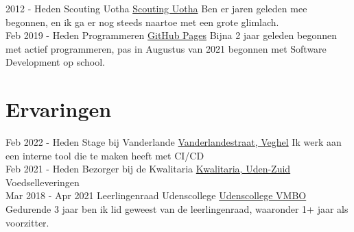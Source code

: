 \documentclass[letterpaper]{twentysecondcv} %
\begin{document}
    \begin{twenty} %
        \twentyitem
        {2012 -}
        {Heden}
        {Scouting Uotha}
        {\href{https://www.uotha.nl/}{Scouting Uotha}}
        {}
        { Ben er jaren geleden mee begonnen, en ik ga er nog steeds naartoe met een grote glimlach.}\\
        \twentyitem
        {Feb 2019 -}
        {Heden}
        {Programmeren}
        {\href{https://tais993.github.io/}{GitHub Pages}}
        {}
        {
            Bijna 2 jaar geleden begonnen met actief programmeren, pas in Augustus van 2021 begonnen met Software Development op school.
        }
    \end{twenty}

    \vspace{6mm}




    \section{Ervaringen}
    \begin{twenty} %
        \twentyitem
        {Feb 2022 -}
        {Heden}
        {Stage bij Vanderlande}
        {\href{https://www.vanderlande.com/}{Vanderlandestraat, Veghel}}
        {}
        {
            Ik werk aan een interne tool die te maken heeft met CI/CD
        }\\
        \twentyitem
        {Feb 2021 -}
        {Heden}
        {Bezorger bij de Kwalitaria}
        {\href{https://kwalitaria.nl/uden-zuid/uden-zuid/}{Kwalitaria, Uden-Zuid}}
        {}
        {Voedselleveringen}\\
        \twentyitem
        {Mar 2018 -}
        {Apr 2021}
        {Leerlingenraad Udenscollege}
        {\href{https://www.udenscollege.nl/vmbo/startpagina-vmbo/}{Udenscollege VMBO}}
        {}
        {
            Gedurende 3 jaar ben ik lid geweest van de leerlingenraad, waaronder 1+ jaar als voorzitter.
        }
    \end{twenty}

    \vspace{6mm}


\end{document}

